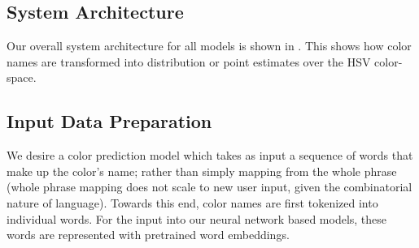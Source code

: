 \documentclass[]{book}
\begin{document}
\subsection{System Architecture}\label{sec:arch}
Our overall system architecture for all models is shown in .
This shows how color names are transformed into distribution or point estimates over the HSV color-space.

\subsection{Input Data Preparation}\label{sec:input-data-preparation}
We desire a color prediction model which takes as input a sequence of words that make up the color's name; rather than simply mapping from the whole phrase (whole phrase mapping does not scale to new user input, given the combinatorial nature of language).
Towards this end, color names are first tokenized into individual words.
For the input into our neural network based models, these words are represented with pretrained word embeddings.
\end{document}
